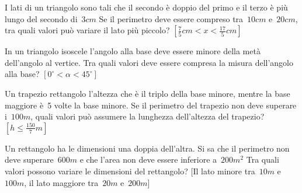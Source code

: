 \begin{multicols}{2}
 \begin{esercizio}[\Ast]
 \label{ese:21.29}
 I lati di un triangolo sono tali che il secondo è doppio del primo e
il terzo è più lungo del secondo di~$3\unit{cm}$ Se il perimetro deve
essere compreso tra~$10\unit{cm}$ e~$20\unit{cm}$, tra quali valori può variare 
il lato
più piccolo? \hfill $\left[\frac{7}{5}\unit{cm}<x<\frac{17}{5}\unit{cm}\right]$
 \end{esercizio}

 \begin{esercizio}[\Ast]
 \label{ese:21.30}
 In un triangolo isoscele l'angolo
alla base deve essere minore della metà dell'angolo
al vertice. Tra quali valori deve essere compresa la misura
dell'angolo alla base? \hfill $\left[0^{\circ}<\alpha<45^{\circ}\right]$
 \end{esercizio}

 \begin{esercizio}[\Ast]
 \label{ese:21.31}
 Un trapezio rettangolo l'altezza che è il triplo
della base minore, mentre la base maggiore è~5 volte la base minore.
Se il perimetro del trapezio non deve superare i~$100\unit{m}$, quali valori
può assumere la lunghezza dell'altezza del
trapezio? \hfill $\left[h\le \frac{150}{7}m\right]$
 \end{esercizio}

 \begin{esercizio}[\Ast]
 \label{ese:21.32}
 Un rettangolo ha le dimensioni una doppia dell'altra.
Si sa che il perimetro non deve superare~$600\unit{m}$ e che
l'area non deve essere inferiore a~$200\unit{m^2}$ Tra quali
valori possono variare le dimensioni del rettangolo?
\hfill [Il lato minore tra~$10\unit{m}$ e~$100\unit{m}$, 
        il lato maggiore tra~$20\unit{m}$ e~$200\unit{m}$]
 \end{esercizio}
\end{multicols}

